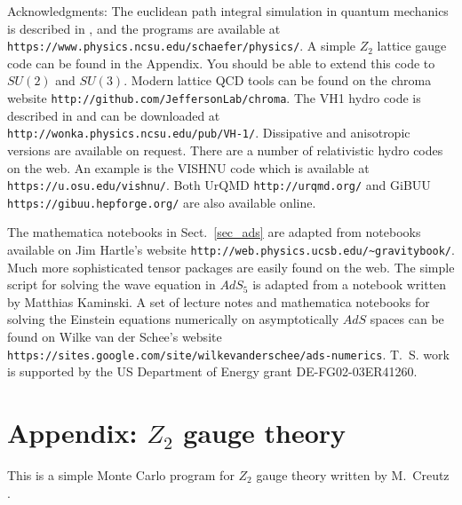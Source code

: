  Acknowledgments: The euclidean path integral simulation in quantum
mechanics is described in \cite{Schafer:2004xa}, and the programs are 
available at {\tt https://www.physics.ncsu.edu/schaefer/{\allowbreak}physics/}. 
A simple $Z_2$ lattice gauge code can be found in the Appendix. You should be
able to extend this code to $SU(2)$ and $SU(3)$. Modern lattice QCD tools
can be found on the chroma website {\tt http://github.com/JeffersonLab/chroma}.
The VH1 hydro code is described in \cite{Blondin:1993} and can be downloaded
at {\tt http://wonka.{\allowbreak}physics.ncsu.edu/pub/VH-1/}. Dissipative 
and anisotropic versions are available on request. There are a number of 
relativistic hydro codes on the web. An example is the VISHNU code 
\cite{Shen:2014vra} which is available at {\tt https://u.osu.edu/vishnu/}. 
Both UrQMD {\tt http://urqmd.org/} and GiBUU 
{\tt https://gibuu.{\allowbreak}hepforge.org/} are also available online.

 The mathematica notebooks in Sect.~\ref{sec_ads} are adapted from
notebooks available on Jim Hartle's website 
{\tt http://web.{\allowbreak}physics.ucsb.edu/{\textasciitilde}gravitybook/}. 
Much more sophisticated tensor packages are easily found on the web. 
The simple script for solving the wave equation in $AdS_5$ is adapted 
from a notebook written by Matthias Kaminski. A set of lecture notes 
and mathematica notebooks for solving the Einstein equations numerically
on asymptotically $AdS$ spaces can be found on Wilke van der Schee's website
{\tt https://sites.google.com/site/{\allowbreak}wilkevanderschee/ads-numerics}.
T.~S. work is supported by the US Department 
of Energy grant DE-FG02-03ER41260. 

\section{Appendix: $Z_2$ gauge theory}

 This is a simple Monte Carlo program for $Z_2$ gauge theory 
written by M.~Creutz \cite{Creutz:2004}.

